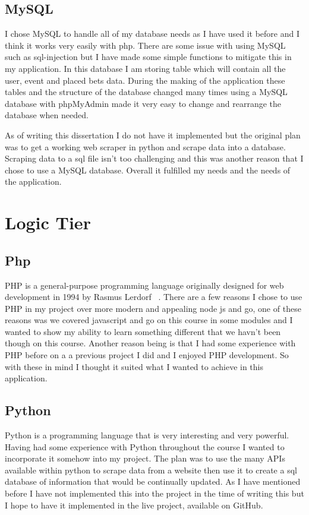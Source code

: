 \subsection{MySQL}
I chose MySQL to handle all of my database needs as I have used it before and I think it works very easily with php. There are some issue with using MySQL such as sql-injection but I have made some simple functions to mitigate this in my application. In this database I am storing table which will contain all the user, event and placed bets data. During the making of the application these tables and the structure of the database changed many times using a MySQL database with phpMyAdmin made it very easy to change and rearrange the database when needed.

As of writing this dissertation I do not have it implemented but the original plan was to get a working web scraper in python and scrape data into a database. Scraping data to a sql file isn't too challenging and this was another reason that I chose to use a MySQL database. Overall it fulfilled my needs and the needs of the application. 

\section{Logic Tier}
\subsection{Php}
PHP is a general-purpose programming language originally designed for web development in 1994 by Rasmus Lerdorf~\cite{php} . There are a few reasons I chose to use PHP in my project over more modern and appealing node js and go, one of these reasons was we covered javascript and go on this course in some modules and I wanted to show my ability to learn something different that we havn't been though on this course. Another reason being is that I had some experience with PHP before on a a previous project I did and I enjoyed PHP development. So with these in mind I thought it suited what I wanted to achieve in this application.

\subsection{Python}
Python is a programming language that is very interesting and very powerful. Having had some experience with Python throughout the course I wanted to incorporate it somehow into my project. The plan was to use the many APIs available within python to scrape data from a website then use it to create a sql database of information that would be continually updated. As I have mentioned before I have not implemented this into the project in the time of writing this but I hope to have it implemented in the live project, available on GitHub.



